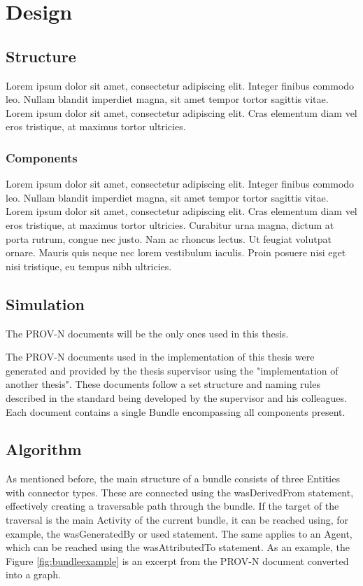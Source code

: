 \documentclass[
  digital,     %
  oneside,     %
  nosansbold,  %
  nocolorbold, %
  lof,         %
  lot,         %
]{fithesis4}
\begin{document}
\chapter{Design}
\section{Structure}
Lorem ipsum dolor sit amet, consectetur adipiscing elit. Integer finibus commodo leo. Nullam blandit imperdiet magna, sit amet tempor tortor sagittis vitae. Lorem ipsum dolor sit amet, consectetur adipiscing elit. Cras elementum diam vel eros tristique, at maximus tortor ultricies.

\subsection{Components}
Lorem ipsum dolor sit amet, consectetur adipiscing elit. Integer finibus commodo leo. Nullam blandit imperdiet magna, sit amet tempor tortor sagittis vitae. Lorem ipsum dolor sit amet, consectetur adipiscing elit. Cras elementum diam vel eros tristique, at maximus tortor ultricies. Curabitur urna magna, dictum at porta rutrum, congue nec justo. Nam ac rhoncus lectus. Ut feugiat volutpat ornare. Mauris quis neque nec lorem vestibulum iaculis. Proin posuere nisi eget nisi tristique, eu tempus nibh ultricies.

\section{Simulation}
\shorthandoff{-}
The PROV-N documents will be the only ones used in this thesis.

The PROV-N documents used in the implementation of this thesis were generated and provided by the thesis supervisor using the "implementation of another thesis". These documents follow a set structure and naming rules described in the standard being developed by the supervisor and his colleagues. Each document contains a single Bundle encompassing all components present.
\shorthandon{-}

\section{Algorithm}
\shorthandoff{-}
As mentioned before, the main structure of a bundle consists of three Entities with connector types. These are connected using the wasDerivedFrom statement, effectively creating a traversable path through the bundle. If the target of the traversal is the main Activity of the current bundle, it can be reached using, for example, the wasGeneratedBy or used statement. The same applies to an Agent, which can be reached using the wasAttributedTo statement. As an example, the Figure \ref{fig:bundleexample} is an excerpt from the PROV-N document converted into a graph.
\end{document}
